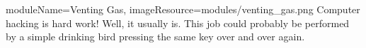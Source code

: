 \begin{needymodule}{
  moduleName=Venting Gas,
  imageResource=modules/venting_gas.png
}
{
  Computer hacking is hard work!
  Well, it usually is.
  This job could probably be performed by a simple drinking bird pressing the same key over and over again.
}
  \begin{bulletlist}
  \end{bulletlist}

\end{needymodule}
